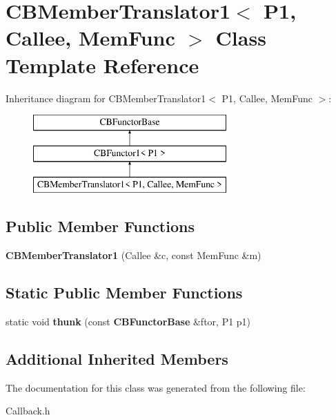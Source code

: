 \section{C\+B\+Member\+Translator1$<$ P1, Callee, Mem\+Func $>$ Class Template Reference}
\label{classCBMemberTranslator1}
Inheritance diagram for C\+B\+Member\+Translator1$<$ P1, Callee, Mem\+Func $>$\+:\begin{figure}[H]
\begin{center}
\leavevmode
\includegraphics[height=3.000000cm]{classCBMemberTranslator1}
\end{center}
\end{figure}
\subsection*{Public Member Functions}
\begin{DoxyCompactItemize}
\item 
{\bfseries C\+B\+Member\+Translator1} (Callee \&c, const Mem\+Func \&m)\label{classCBMemberTranslator1_ab7349f1696db7d061f6a712a50c44f6b}

\end{DoxyCompactItemize}
\subsection*{Static Public Member Functions}
\begin{DoxyCompactItemize}
\item 
static void {\bfseries thunk} (const {\bf C\+B\+Functor\+Base} \&ftor, P1 p1)\label{classCBMemberTranslator1_a3946d0edab5f98a04d049f61b3b17b77}

\end{DoxyCompactItemize}
\subsection*{Additional Inherited Members}


The documentation for this class was generated from the following file\+:\begin{DoxyCompactItemize}
\item 
Callback.\+h\end{DoxyCompactItemize}
